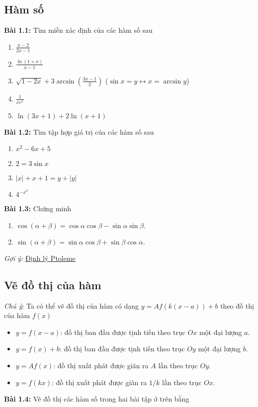 \subsection*{Hàm số}
\textbf{Bài 1.1:} Tìm miền xác định của các hàm số sau
\begin{enumerate}[label=(\alph*)]
\item \(\frac{x-2}{2x-1}\)
\item $\frac{\ln(1+x)}{x-1}$
\item $\sqrt{1-2x}+3\arcsin\left(\frac{3x-1}{2}\right)$ \quad ($\sin{x}=y\leftrightarrow x=\arcsin y$)
\item $\frac{1}{x e^x}$
\item $\ln{(3x+1)}+2\ln{(x+1)}$
\end{enumerate}

\vspace{5pt}
\textbf{Bài 1.2:} Tìm tập hợp giá trị của các hàm số sau
\begin{enumerate}[label=(\alph*)]
\item $x^2 -6x+5$
\item $2=3\sin x$
\item $|x| + x + 1 = y + |y|$
\item $4^{-x^2}$
\end{enumerate}
\vspace{5pt}

\textbf{Bài 1.3:} Chứng minh
\begin{enumerate}[label=(\alph*)]
\item $\cos(\alpha+\beta)=\cos\alpha\cos\beta - \sin\alpha\sin\beta.$
\item $\sin(\alpha+\beta)=\sin\alpha\cos\beta + \sin\beta\cos\alpha.$
\end{enumerate}

\emph{Gợi ý:} \href{https://vi.wikipedia.org/wiki/%C4%90%E1%BB%8Bnh_l%C3%BD_Ptoleme}{Định lý Ptoleme}

\subsection*{Vẽ đồ thị của hàm}
\emph{Chú ý}: Ta có thể vẽ đồ thị của hàm có dạng $y=Af(k(x-a))+b$ theo đồ thị của hàm $f(x)$
\begin{itemize}
    \item $y=f(x-a)$: đồ thị ban đầu được tịnh tiến theo trục $Ox$ một đại lượng $a$.
    \item $y=f(x)+b$: đồ thị ban đầu được tịnh tiến theo trục $Oy$ một đại lượng $b$.
    \item $y=Af(x)$: đồ thị xuất phát được giãn ra $A$ lần theo trục $Oy$.
    \item $y=f(kx)$: đồ thị xuất phát được giãn ra $1/k$ lần theo trục $Ox$.
\end{itemize}
\textbf{Bài 1.4:} Vẽ đồ thị các hàm số trong hai bài tập ở trên bằng

